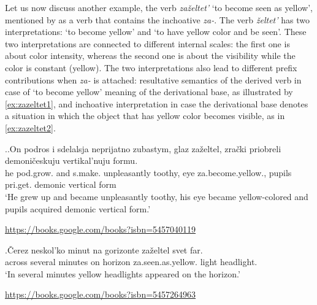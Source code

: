 Let us now discuss another example, the verb \textit{za\v{z}eltet'} `to become seen as yellow', mentioned by \citet{Braginsky:08} as a verb that contains the inchoative \textit{za-}. The verb \textit{\v{z}eltet'} has two interpretations: `to become yellow' and `to have yellow color and be seen'. These two interpretations are connected to different internal scales: the first one is about color intensity, whereas the second one is about the visibility while the color is constant (yellow). The two interpretations also lead to different prefix contributions when \textit{za-} is attached: resultative semantics of the derived verb in case of `to become yellow' meaning of the derivational base, as illustrated by \ref{ex:zazeltet1}, and inchoative interpretation in case the derivational base denotes a  situation in which the object that has yellow color becomes visible, as in \ref{ex:zazeltet2}.


\ex.\label{ex:zazeltet}\ag.\label{ex:zazeltet1}On podros i sdelalsja neprijatno zubastym, glaz za\v{z}eltel, zra\v{c}ki priobreli demoni\v{c}eskuju vertikal'nuju formu.\\
he pod.grow. and s.make. unpleasantly toothy, eye za.become.yellow., pupils pri.get. demonic vertical form\\
`He grew up and became unpleasantly toothy, his eye became yellow-colored and pupils acquired demonic vertical form.'
\begin{flushright}
\vspace{-0.5em}
\url{https://books.google.com/books?isbn=5457040119}
\end{flushright}
\bg.\label{ex:zazeltet2}\v{C}erez neskol'ko minut na gorizonte za\v{z}eltel svet far.\\
across several minutes on horizon za.seen.as.yellow. light headlight.\\
`In several minutes yellow headlights appeared on the horizon.'
\begin{flushright}
\vspace{-0.5em}
\url{https://books.google.com/books?isbn=5457264963}
\end{flushright}

